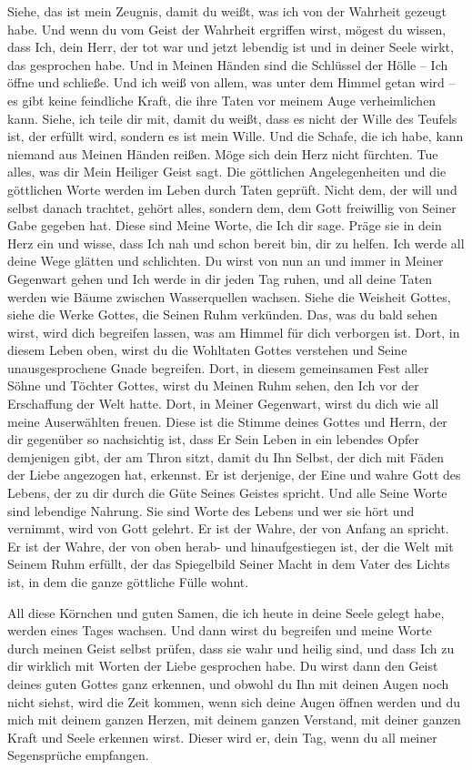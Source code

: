  Siehe, das ist mein Zeugnis, damit du weißt, was ich von der Wahrheit gezeugt habe. Und wenn du vom Geist der Wahrheit ergriffen wirst, mögest du wissen, dass Ich, dein Herr, der tot war und jetzt lebendig ist und in deiner Seele wirkt, das gesprochen habe. Und in Meinen Händen sind die Schlüssel der Hölle -- Ich öffne und schließe. Und ich weiß von allem, was unter dem Himmel getan wird -- es gibt keine feindliche Kraft, die ihre Taten vor meinem Auge verheimlichen kann. Siehe, ich teile dir mit, damit du weißt, dass es nicht der Wille des Teufels ist, der erfüllt wird, sondern es ist mein Wille. Und die Schafe, die ich habe, kann niemand aus Meinen Händen reißen. Möge sich dein Herz nicht fürchten. Tue alles, was dir Mein Heiliger Geist sagt. Die göttlichen Angelegenheiten und die göttlichen Worte werden im Leben durch Taten geprüft. Nicht dem, der will und selbst danach trachtet, gehört alles, sondern dem, dem Gott freiwillig von Seiner Gabe gegeben hat. Diese sind Meine Worte, die Ich dir sage. Präge sie in dein Herz ein und wisse, dass Ich nah und schon bereit bin, dir zu helfen. Ich werde all deine Wege glätten und schlichten. Du wirst von nun an und immer in Meiner Gegenwart gehen und Ich werde in dir jeden Tag ruhen, und all deine Taten werden wie Bäume zwischen Wasserquellen wachsen.
 Siehe die Weisheit Gottes, siehe die Werke Gottes, die Seinen Ruhm verkünden. Das, was du bald sehen wirst, wird dich begreifen lassen, was am Himmel für dich verborgen ist. Dort, in diesem Leben oben, wirst du die Wohltaten Gottes verstehen und Seine unausgesprochene Gnade begreifen. Dort, in diesem gemeinsamen Fest aller Söhne und Töchter Gottes, wirst du Meinen Ruhm sehen, den Ich vor der Erschaffung der Welt hatte. Dort, in Meiner Gegenwart, wirst du dich wie all meine Auserwählten freuen. Diese ist die Stimme deines Gottes und Herrn, der dir gegenüber so nachsichtig ist, dass Er Sein Leben in ein lebendes Opfer demjenigen gibt, der am Thron sitzt, damit du Ihn Selbst, der dich mit Fäden der Liebe angezogen hat, erkennst. Er ist derjenige, der Eine und wahre Gott des Lebens, der zu dir durch die Güte Seines Geistes spricht. Und alle Seine Worte sind lebendige Nahrung. Sie sind Worte des Lebens und wer sie hört und vernimmt, wird von Gott gelehrt. Er ist der Wahre, der von Anfang an spricht. Er ist der Wahre, der von oben herab- und hinaufgestiegen ist, der die Welt mit Seinem Ruhm erfüllt, der das Spiegelbild Seiner Macht in dem Vater des Lichts ist, in dem die ganze göttliche Fülle wohnt.
 
 All diese Körnchen und guten Samen, die ich heute in deine Seele gelegt habe, werden eines Tages wachsen. Und dann wirst du begreifen und meine Worte durch meinen Geist selbst prüfen, dass sie wahr und heilig sind, und dass Ich zu dir wirklich mit Worten der Liebe gesprochen habe. Du wirst dann den Geist deines guten Gottes ganz erkennen, und obwohl du Ihn mit deinen Augen noch nicht siehst, wird die Zeit kommen, wenn sich deine Augen öffnen werden und du mich mit deinem ganzen Herzen, mit deinem ganzen Verstand, mit deiner ganzen Kraft und Seele erkennen wirst. Dieser wird er, dein Tag, wenn du all meiner Segensprüche empfangen. 

